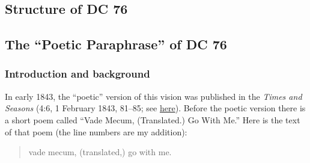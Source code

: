 	\subsection{Structure of DC 76}
		\label{EXSS-DC76-STRUCTURE}
		
	\subsection{The ``Poetic Paraphrase'' of DC 76}
		\label{EXSS-DC76-POETIC}
		
		\subsubsection{Introduction and background}
		
			In early 1843, the ``poetic'' version of this vision was published in the \textit{Times and Seasons} (4:6, 1 February 1843, 81--85; see \hyperref[EMS-1843-JS-CIR-1-CIR-15-FEB-1843]{here}). Before the poetic version there is a short poem called ``Vade Mecum, (Translated.) Go With Me.'' Here is the text of that poem (the line numbers are my addition):
			
			\begin{quote}
				vade mecum, (translated,) go with me.
			\end{quote}
		
